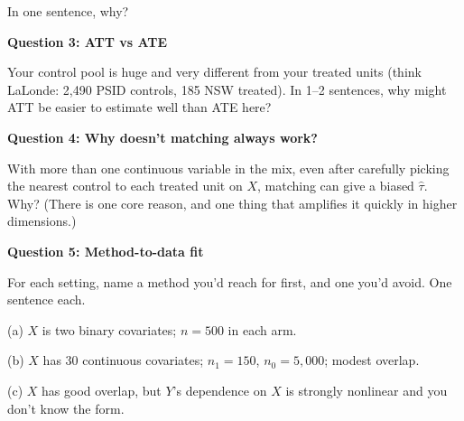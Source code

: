 \documentclass[11pt]{article}
\begin{document}
\medskip
\noindent In one sentence, why?

\vspace{2cm}

\clearpage

\noindent\textbf{Question 3: ATT vs ATE}

\medskip
\noindent Your control pool is huge and very different from your treated units (think LaLonde: 2{,}490 PSID controls, 185 NSW treated). In 1--2 sentences, why might ATT be easier to estimate well than ATE here?

\vspace{4cm}


\noindent\textbf{Question 4: Why doesn't matching always work?}

\medskip
\noindent With more than one continuous variable in the mix, even after carefully picking the nearest control to each treated unit on $X$, matching can give a biased $\widehat\tau$. Why? (There is one core reason, and one thing that amplifies it quickly in higher dimensions.)

\vspace{4cm}


\noindent\textbf{Question 5: Method-to-data fit}

\medskip
\noindent For each setting, name a method you'd reach for first, and one you'd avoid. One sentence each.

\medskip
\noindent (a) $X$ is two binary covariates; $n = 500$ in each arm.

\vspace{2.5cm}

\noindent (b) $X$ has 30 continuous covariates; $n_1 = 150$, $n_0 = 5{,}000$; modest overlap.

\vspace{2.5cm}

\noindent (c) $X$ has good overlap, but $Y$'s dependence on $X$ is strongly nonlinear and you don't know the form.

\vspace{2.5cm}
\end{document}
